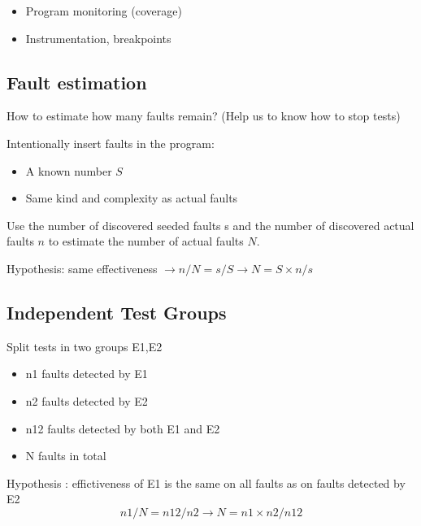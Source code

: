 \begin{itemize}
    \item Program monitoring (coverage)
    \item Instrumentation, breakpoints
\end{itemize}

\subsection{Fault estimation}

How to estimate how many faults remain? (Help us to know how to stop tests) \newline

Intentionally insert faults in the program:

\begin{itemize}
    \item A known number $S$
    \item Same kind and complexity as actual faults
\end{itemize}

Use the number of discovered seeded faults s and the number of discovered actual faults $n$ to estimate the number of actual faults $N$.\newline

Hypothesis: same effectiveness $\rightarrow n / N = s / S \rightarrow N = S \times n / s$

\subsection{Independent Test Groups}
Split tests in two groups E1,E2
\begin{itemize}
	\item n1 faults detected by E1
	\item n2 faults detected by E2
	\item n12 faults detected by both E1 and E2
	\item N faults in total
\end{itemize} 
Hypothesis : effictiveness of E1 is the same on all faults as on faults
detected by E2
$$ n1/N=n12/n2 \rightarrow N = n1\times n2/n12$$

